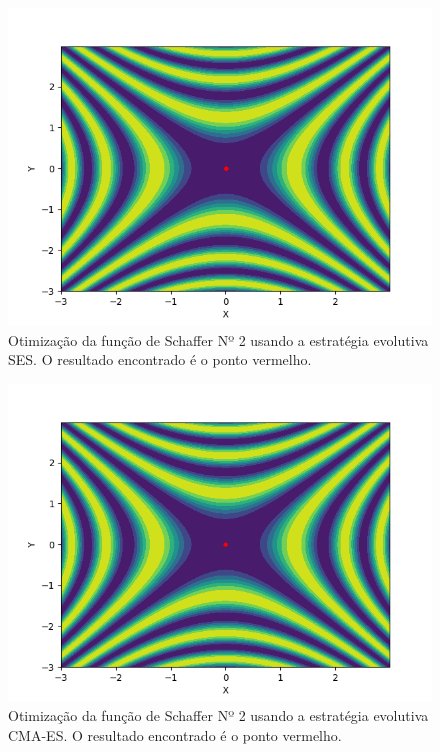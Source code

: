 \documentclass[conference]{IEEEtran}
\begin{document}
\begin{figure}[htbp]
\centering
\centerline{\includegraphics[scale=0.5]{imagens/schaffer2d/ses.png}}
\caption{Otimização da função de Schaffer Nº 2 usando a estratégia evolutiva SES. O resultado encontrado é o ponto vermelho.}
\label{schaffer2d/ses}
\end{figure} 

\begin{figure}[htbp]
\centering
\centerline{\includegraphics[scale=0.5]{imagens/schaffer2d/cmaes.png}}
\caption{Otimização da função de Schaffer Nº 2 usando a estratégia evolutiva CMA-ES. O resultado encontrado é o ponto vermelho.}
\label{schaffer2d/cmaes}
\end{figure}
\end{document}
